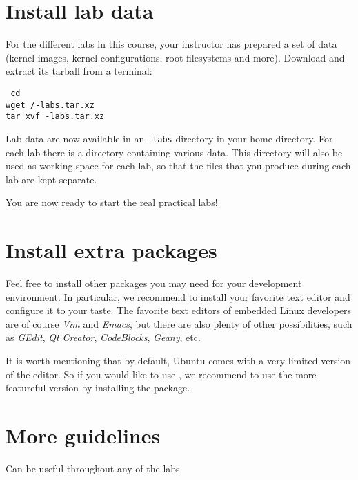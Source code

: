 
\section{Install lab data}

For the different labs in this course, your instructor has prepared a
set of data (kernel images, kernel configurations, root filesystems
and more). Download and extract its tarball from a terminal:


{\scriptsize
{\tt
cd \\
wget \sessionurl/\longname-labs.tar.xz \\
tar xvf \longname-labs.tar.xz \\
}
}

Lab data are now available in an {\tt \longname-labs} directory in
your home directory. For each lab there is a directory containing
various data. This directory will also be used as working space for
each lab, so that the files that you produce during each lab are kept
separate.

You are now ready to start the real practical labs!

\section{Install extra packages}

Feel free to install other packages you may need for your development
environment. In particular, we recommend to install your favorite text
editor and configure it to your taste. The favorite text editors of
embedded Linux developers are of course {\em Vim} and {\em Emacs}, but
there are also plenty of other possibilities, such as {\em GEdit},
{\em Qt Creator}, {\em CodeBlocks}, {\em Geany}, etc.

It is worth mentioning that by default, Ubuntu comes with a very
limited version of the  editor. So if you would like to use
, we recommend to use the more featureful version by
installing the  package.

\section{More guidelines}

Can be useful throughout any of the labs

